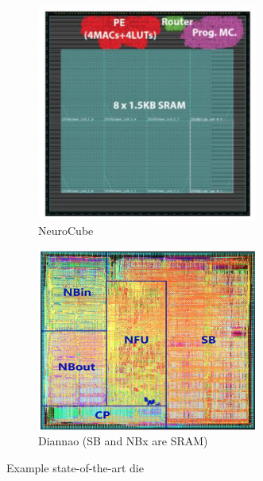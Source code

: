 {{%
\vspace{-5mm}
\begin{figure}
\centering
\begin{subfigure}{.45\textwidth}
  \centering
  \includegraphics[width=0.8\textwidth]{Chapter-2/figs/kim2016neurocube_fig4}
  \captionsetup{justification=centering, skip=6pt}
  \caption{NeuroCube}
  \label{fig:NeuroCubeDie}
\end{subfigure}%
\begin{subfigure}{.45\textwidth}
  \centering
  \includegraphics[width=0.8\textwidth]{Chapter-2/figs/chen2014diannao_fig15}
  \captionsetup{justification=centering, skip=10pt}
  \caption{Diannao (SB and NBx are SRAM)}
  \label{fig:DiannaoDie}
\end{subfigure}
\captionsetup{justification=centering, skip=3pt}
\caption{Example state-of-the-art die}
\label{fig:Example state-of-the-art die}
\end{figure}
\vspace{-5mm}
\fi


}}
